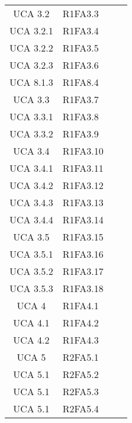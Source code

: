 {\begin{longtable}{ c C{4cm} c c}
UCA 3.2 & R1FA3.3\\

UCA 3.2.1 & R1FA3.4\\


UCA 3.2.2 & R1FA3.5\\

UCA 3.2.3 & R1FA3.6\\

UCA 8.1.3 & R1FA8.4\\

UCA 3.3 & R1FA3.7\\

UCA 3.3.1 & R1FA3.8\\

UCA 3.3.2 & R1FA3.9\\

UCA 3.4 & R1FA3.10\\

UCA 3.4.1 & R1FA3.11\\

UCA 3.4.2 & R1FA3.12\\

UCA 3.4.3 & R1FA3.13\\


UCA 3.4.4 & R1FA3.14\\

UCA 3.5 & R1FA3.15\\

UCA 3.5.1 & R1FA3.16\\

UCA 3.5.2 & R1FA3.17\\

UCA 3.5.3 & R1FA3.18\\

UCA 4 & R1FA4.1\\

UCA 4.1 & R1FA4.2\\

UCA 4.2 & R1FA4.3\\

UCA 5 & R2FA5.1\\

UCA 5.1 & R2FA5.2\\


UCA 5.1 & R2FA5.3\\

UCA 5.1 & R2FA5.4\\


\end{longtable}}
